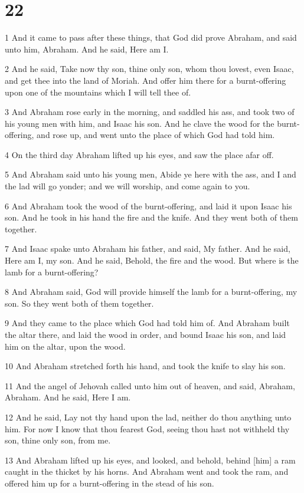 \chapter{22}

\par 1 And it came to pass after these things, that God did prove Abraham, and said unto him, Abraham. And he said, Here am I.
\par 2 And he said, Take now thy son, thine only son, whom thou lovest, even Isaac, and get thee into the land of Moriah. And offer him there for a burnt-offering upon one of the mountains which I will tell thee of.
\par 3 And Abraham rose early in the morning, and saddled his ass, and took two of his young men with him, and Isaac his son. And he clave the wood for the burnt-offering, and rose up, and went unto the place of which God had told him.
\par 4 On the third day Abraham lifted up his eyes, and saw the place afar off.
\par 5 And Abraham said unto his young men, Abide ye here with the ass, and I and the lad will go yonder; and we will worship, and come again to you.
\par 6 And Abraham took the wood of the burnt-offering, and laid it upon Isaac his son. And he took in his hand the fire and the knife. And they went both of them together.
\par 7 And Isaac spake unto Abraham his father, and said, My father. And he said, Here am I, my son. And he said, Behold, the fire and the wood. But where is the lamb for a burnt-offering?
\par 8 And Abraham said, God will provide himself the lamb for a burnt-offering, my son. So they went both of them together.
\par 9 And they came to the place which God had told him of. And Abraham built the altar there, and laid the wood in order, and bound Isaac his son, and laid him on the altar, upon the wood.
\par 10 And Abraham stretched forth his hand, and took the knife to slay his son.
\par 11 And the angel of Jehovah called unto him out of heaven, and said, Abraham, Abraham. And he said, Here I am.
\par 12 And he said, Lay not thy hand upon the lad, neither do thou anything unto him. For now I know that thou fearest God, seeing thou hast not withheld thy son, thine only son, from me.
\par 13 And Abraham lifted up his eyes, and looked, and behold, behind [him] a ram caught in the thicket by his horns. And Abraham went and took the ram, and offered him up for a burnt-offering in the stead of his son.

